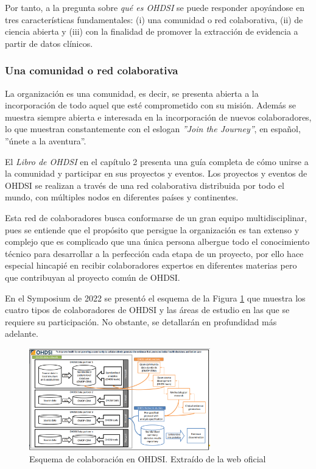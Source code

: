 Por tanto, a la pregunta sobre \textit{qué es OHDSI} se puede responder apoyándose en tres características fundamentales: (i)  una comunidad o red colaborativa, (ii) de ciencia abierta y (iii) con la finalidad de promover la extracción de evidencia a partir de datos clínicos.

\subsubsection{Una comunidad o red colaborativa}

La organización es una comunidad, es decir, se presenta abierta a la incorporación de todo aquel que esté comprometido con su misión. Además se muestra siempre abierta e interesada en la incorporación de nuevos colaboradores, lo que muestran constantemente con el eslogan \textit{''Join the Journey''}, en español, ''únete a la aventura''. 

El \textit{Libro de OHDSI} en el capítulo 2 presenta una guía completa de cómo unirse a la comunidad y participar en sus proyectos y eventos. Los proyectos y eventos de OHDSI se realizan a través de una red colaborativa distribuida por todo el mundo, con múltiples nodos en diferentes países y continentes.

Esta red de colaboradores busca conformarse de un gran equipo multidisciplinar, pues se entiende que el propósito que persigue la organización es tan extenso y complejo que es complicado que una única persona albergue todo el conocimiento técnico para desarrollar a la perfección cada etapa de un proyecto, por ello hace especial hincapié en recibir colaboradores expertos en diferentes materias pero que contribuyan al proyecto común de OHDSI.

En el Symposium de 2022 se presentó el esquema de la Figura \ref{fig:collaboratorsSchema} que muestra los cuatro tipos de colaboradores de OHDSI y las áreas de estudio en las que se requiere su participación. No obstante, se detallarán en profundidad más adelante.

\begin{figure}[H]
    \centering
    \includegraphics[width=0.70\textwidth]{figures/collaboratorsSchema.png}
    \caption{Esquema de colaboración en OHDSI. Extraído de la web oficial \cite{OHDSIwebsite}}
    \label{fig:collaboratorsSchema}
\end{figure}


